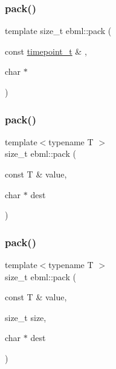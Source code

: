 \subsubsection{\texorpdfstring{pack()}{pack()}\hspace{0.1cm}{\footnotesize\ttfamily [15/18]}}
{\footnotesize\ttfamily template size\+\_\+t ebml\+::pack (\begin{DoxyParamCaption}\item[{const \mbox{\hyperlink{namespaceebml_a7e667ec3fe8b51fb5b8f9690734d8638}{timepoint\+\_\+t}} \&}]{,  }\item[{char $\ast$}]{ }\end{DoxyParamCaption})}

\mbox{\label{namespaceebml_a902c75e723a22780c779a3fc1531a07f}} 
\subsubsection{\texorpdfstring{pack()}{pack()}\hspace{0.1cm}{\footnotesize\ttfamily [16/18]}}
{\footnotesize\ttfamily template$<$typename T $>$ \\
size\+\_\+t ebml\+::pack (\begin{DoxyParamCaption}\item[{const T \&}]{value,  }\item[{char $\ast$}]{dest }\end{DoxyParamCaption})}

\mbox{\label{namespaceebml_a2ca9fdcd493e677f02886593a4ae63e0}} 
\subsubsection{\texorpdfstring{pack()}{pack()}\hspace{0.1cm}{\footnotesize\ttfamily [17/18]}}
{\footnotesize\ttfamily template$<$typename T $>$ \\
size\+\_\+t ebml\+::pack (\begin{DoxyParamCaption}\item[{const T \&}]{value,  }\item[{size\+\_\+t}]{size,  }\item[{char $\ast$}]{dest }\end{DoxyParamCaption})}

